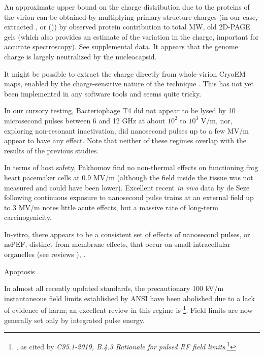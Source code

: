 \documentclass[paper.tex]{subfiles}
\begin{document}
\begin{multicols}{1}
An approximate upper bound on the charge distribution due to the proteins of the virion can be obtained by multiplying primary structure charges (in our case, extracted \cite{CIDER2017}, or (\cite{complete2003})) by observed protein contribution to total MW\cite{Quantitative1981}, old 2D-PAGE gels \cite{Influenza1978}\cite{Structurea} (which also provides an estimate of the variation in the charge, important for accurate spectroscopy). See supplemental data. It appears that the genome charge is largely neutralized by the nucleocapsid.

It might be possible to extract the charge directly from whole-virion CryoEM maps, enabled by the charge-sensitive nature of the technique \cite{Identification2018}\cite{Electrostatic2020}. This has not yet been implemented in any software tools and seems quite tricky. 

In our cursory testing, Bacteriophage T4 did not appear to be lysed by 10 microsecond pulses between 6 and 12 GHz at about $10^2$ to $10^3$ V/m, nor, exploring non-resonant inactivation, did nanosecond pulses up to a few MV/m appear to have any effect. Note that neither of these regimes overlap with the results of the previous studies.

In terms of host safety, Pakhomov \cite{Comparative} find no non-thermal effects on functioning frog heart pacemaker cells at 0.9 MV/m (although the field inside the tissue was not measured and could have been lower). Excellent recent \textit{in vivo} data by de Seze following continuous exposure to nanosecond pulse trains at an external field up to 3 MV/m \cite{Repeated2020} notes little acute effects, but a massive rate of long-term carcinogenicity. 

In-vitro, there appears to be a consistent set of effects of nanosecond pulses, or nsPEF, distinct from membrane effects, that occur on small intracellular organelles (see reviews \cite{Penetration2016c} \cite{Effects2016} ), \cite{Bioeffects}.

Apoptosis \cite{Effect2008}

In almost all recently updated standards, the precautionary 100 kV/m instantaneous field limits established by ANSI have been abolished due to a lack of evidence of harm; an excellent review in this regime is \footnote{\cite{treatyelectromagnetic}, as cited by \textit{C95.1-2019, B.4.3 Rationale for pulsed RF field limits}.\footnote{That same review also contains the following, which highlights the incredible difficulty of obtaining reliable results in this field: "Dr. de Seze also described an experiment in which two sham groups were mistakenly run and a significant difference was found. Dr. Klauenberg noted another series of experiments he reviewed where experimental treatment groups did not vary while the sham groups compared to each other did resulting in a significant difference that was otherwise meaningless."}}. Field limits are now generally set only by integrated pulse energy.


\end{multicols}
\end{document}
